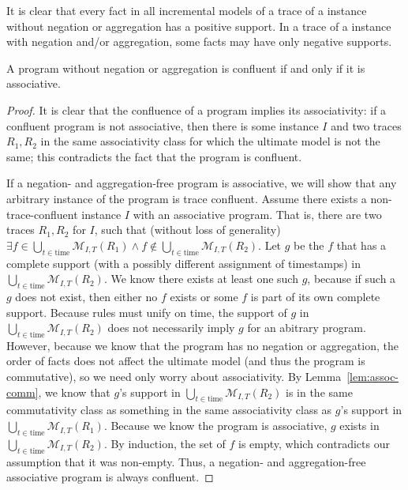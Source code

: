 It is clear that every fact in all incremental models of a trace of a \lang
instance without negation or aggregation has a positive support.  In a trace of
a \lang instance with negation and/or aggregation, some facts may have only
negative supports.

\begin{lemma} \label{lem:mon-assoc}
%
A \lang program without negation or aggregation is confluent if and only if it
is associative.
%
\end{lemma}
%

\begin{proof}
%
It is clear that the confluence of a \lang program implies its
associativity: if a confluent \lang program is not associative, then there is
some instance $I$ and two traces $R_1, R_2$ in the same associativity class for
which the ultimate model is not the same; this contradicts the fact that the
program is confluent.

If a negation- and aggregation-free \lang program is associative, we will show
that any arbitrary instance of the \lang program is trace confluent.   Assume
there exists a non-trace-confluent \lang instance $I$ with an associative
program.  That is, there are two traces $R_1, R_2$ for $I$, such that (without
loss of generality)
$\exists f \in \bigcup_{t \in \text{time}} \mathcal{M}_{I,T}(R_1) \land f
\not\in \bigcup_{t \in \text{time}} \mathcal{M}_{I,T}(R_2)$.  Let $g$ be the
$f$ that has a complete support (with a possibly different assignment of
timestamps) in $\bigcup_{t \in \text{time}} \mathcal{M}_{I,T}(R_2)$.  We know
there exists at least one such $g$, because if such a $g$ does not exist, then
either no $f$ exists or some $f$ is part of its own complete support.  Because
\lang rules must unify on time, the support of $g$ in $\bigcup_{t \in
\text{time}} \mathcal{M}_{I,T}(R_2)$ does not necessarily imply $g$ for an
abitrary program.  However, because we know that the program has no negation or
aggregation, the order of facts does not affect the ultimate model (and thus
the program is commutative), so we need only worry about associativity.  By
Lemma~\ref{lem:assoc-comm}, we know that $g$'s support in $\bigcup_{t \in
\text{time}} \mathcal{M}_{I,T}(R_2)$ is in the same commutativity class as
something in the same associativity class as $g$'s support in $\bigcup_{t \in
\text{time}} \mathcal{M}_{I,T}(R_1)$.  Because we know the program is
associative, $g$ exists in $\bigcup_{t \in \text{time}}
\mathcal{M}_{I,T}(R_2)$.  By induction, the set of $f$ is empty, which
contradicts our assumption that it was non-empty.  Thus, a negation- and
aggregation-free associative \lang program is always confluent.
%
\end{proof}

